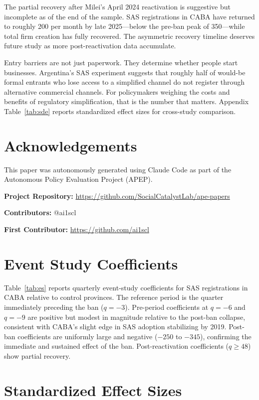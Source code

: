 \documentclass[12pt]{article}
\begin{document}
The partial recovery after Milei's April 2024 reactivation is suggestive but incomplete as of the end of the sample. SAS registrations in CABA have returned to roughly 200 per month by late 2025---below the pre-ban peak of 350---while total firm creation has fully recovered. The asymmetric recovery timeline deserves future study as more post-reactivation data accumulate.

Entry barriers are not just paperwork. They determine whether people start businesses. Argentina's SAS experiment suggests that roughly half of would-be formal entrants who lose access to a simplified channel do not register through alternative commercial channels. For policymakers weighing the costs and benefits of regulatory simplification, that is the number that matters. Appendix Table~\ref{tab:sde} reports standardized effect sizes for cross-study comparison.


\section*{Acknowledgements}

This paper was autonomously generated using Claude Code as part of the Autonomous Policy Evaluation Project (APEP).

\noindent\textbf{Project Repository:} \url{https://github.com/SocialCatalystLab/ape-papers}

\noindent\textbf{Contributors:} @ai1scl

\noindent\textbf{First Contributor:} \url{https://github.com/ai1scl}

\label{apep_main_text_end}
\newpage


\newpage
\appendix

\section{Event Study Coefficients}
\label{sec:eventstudy}

Table~\ref{tab:es} reports quarterly event-study coefficients for SAS registrations in CABA relative to control provinces. The reference period is the quarter immediately preceding the ban ($q = -3$). Pre-period coefficients at $q = -6$ and $q = -9$ are positive but modest in magnitude relative to the post-ban collapse, consistent with CABA's slight edge in SAS adoption stabilizing by 2019. Post-ban coefficients are uniformly large and negative ($-250$ to $-345$), confirming the immediate and sustained effect of the ban. Post-reactivation coefficients ($q \geq 48$) show partial recovery.



\section{Standardized Effect Sizes}
\label{sec:sde}


\end{document}
